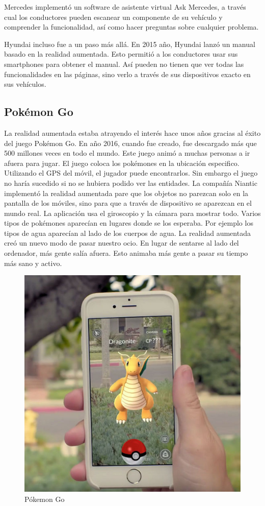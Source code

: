 \documentclass[a4paper,11pt]{scrartcl}
\begin{document}
\par Mercedes implementó un software\cite{mercedes} de asistente virtual Ask Mercedes, a través cual los conductores pueden escanear un componente de su vehículo y comprender la funcionalidad, así como hacer preguntas sobre cualquier problema.

\par Hyundai incluso fue a un paso más allá. En 2015 año, Hyundai lanzó un manual basado en la realidad aumentada\cite{hyundai}. Esto permitió a los conductores usar sus smartphones para obtener el manual. Así pueden no tienen que ver todas las funcionalidades en las páginas, sino verlo a través de sus dispositivos exacto en sus vehículos.


\subsection{Pokémon Go}
La realidad aumentada estaba atrayendo el interés hace unos años gracias al éxito del juego Pokémon Go. En año 2016, cuando fue creado, fue descargado más que 500 millones veces en todo el mundo. Este juego animó a muchas personas a ir afuera para jugar. El juego coloca los pokémones en la ubicación especifico. Utilizando el GPS del móvil, el jugador puede encontrarlos. Sin embargo el juego no haría sucedido si no se hubiera podido ver las entidades. La compañía Niantic implementó la realidad aumentada pare que los objetos no parezcan solo en la pantalla de los móviles, sino para que a través de dispositivo se aparezcan en el mundo real. La aplicación usa el giroscopio y la cámara para mostrar todo. Varios tipos de pokémones aparecían en lugares donde se los esperaba. Por ejemplo los tipos de agua aparecían al lado de los cuerpos de agua. La realidad aumentada creó un nuevo modo de pasar nuestro ocio. En lugar de sentarse al lado del ordenador, más gente salía afuera. Esto animaba más gente a pasar su tiempo más sano y activo.

\begin{figure}[h]
    \centering
    \includegraphics[width=0.5\linewidth]{pokemongo}
    \caption{Pókemon Go \cite{imgpokemongo}}
\end{figure}
\end{document}

